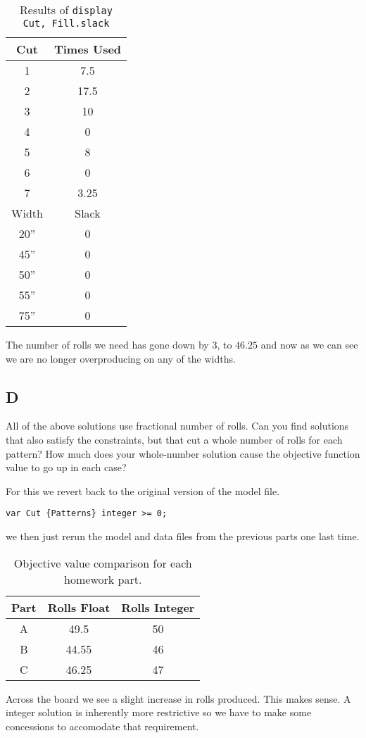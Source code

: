 \begin{table}[!ht]
	\centering
	\begin{tabular}{|c|c|}
		\hline
		Cut & Times Used \\
		\hline
		1 & 7.5 \\
		2 & 17.5 \\
		3 & 10 \\
		4 & 0 \\
		5 & 8 \\
		6 & 0 \\
		7 & 3.25 \\
		\hline
		Width & Slack \\
		\hline 
		20'' & 0 \\
		45'' & 0 \\
		50'' & 0 \\
		55'' & 0 \\
		75'' & 0 \\
		\hline
	\end{tabular}
	\caption{Results of \texttt{display Cut, Fill.slack}}
	\label{tab:<+label+>}
\end{table}

The number of rolls we need has gone down by 3, to $46.25$ and now as we can see we are no longer overproducing on any of the widths. 

\subsection*{D}

\prob

All of the above solutions use fractional number of rolls. Can you find solutions that also satisfy the constraints, but that cut a whole number of rolls for each pattern? How much does your whole-number solution cause the objective function value to go up in each case?

\sol

For this we revert back to the original version of the model file.

\begin{lstlisting}
var Cut {Patterns} integer >= 0;
\end{lstlisting}

we then just rerun the model and data files from the previous parts one last time.

\begin{table}[!ht]
	\centering
	\begin{tabular}{|c|c|c|}
		\hline
		Part & Rolls Float & Rolls Integer \\
		\hline
		A & 49.5 & 50 \\
		B & 44.55 & 46 \\
		C & 46.25 & 47 \\
		\hline
	\end{tabular}
	\caption{Objective value comparison for each homework part.}
\end{table}

Across the board we see a slight increase in rolls produced. This makes sense. A integer solution is inherently more restrictive so we have to make some concessions to accomodate that requirement.